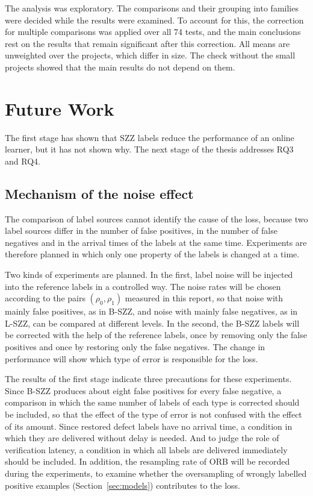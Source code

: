 \documentclass[12pt,a4paper,oneside]{report}
\newcommand{\rhoz}{\rho_0}
\newcommand{\rhoo}{\rho_1}
\begin{document}
The analysis was exploratory. The comparisons and their grouping into
families were decided while the results were examined. To account for this,
the correction for multiple comparisons was applied over all 74 tests, and
the main conclusions rest on the results that remain significant after this
correction. All means are unweighted over the projects, which differ in
size. The check without the small projects showed that the main results do
not depend on them.

\section{Future Work}\label{sec:future}

The first stage has shown that SZZ labels reduce the performance of an online
learner, but it has not shown why. The next stage of the thesis addresses
RQ3 and RQ4.

\subsection{Mechanism of the noise effect}

The comparison of label sources cannot identify the cause of the loss,
because two label sources differ in the number of false positives, in the
number of false negatives and in the arrival times of the labels at the same
time. Experiments are therefore planned in which only one property of the
labels is changed at a time.

Two kinds of experiments are planned. In the first, label noise will be
injected into the reference labels in a controlled way. The noise rates will
be chosen according to the pairs $(\rhoz,\rhoo)$ measured in this report, so
that noise with mainly false positives, as in B-SZZ, and noise with mainly
false negatives, as in L-SZZ, can be compared at different levels. In the
second, the B-SZZ labels will be corrected with the help of the reference
labels, once by removing only the false positives and once by restoring only
the false negatives. The change in performance will show which type of error
is responsible for the loss.

The results of the first stage indicate three precautions for these
experiments. Since B-SZZ produces about eight false positives for every false
negative, a comparison in which the same number of labels of each type is
corrected should be included, so that the effect of the type of error is not
confused with the effect of its amount. Since restored defect labels have no
arrival time, a condition in which they are delivered without delay is
needed. And to judge the role of verification latency, a condition in which
all labels are delivered immediately should be included. In addition, the
resampling rate of ORB will be recorded during the experiments, to examine
whether the oversampling of wrongly labelled positive examples
(Section~\ref{sec:models}) contributes to the loss.
\end{document}

